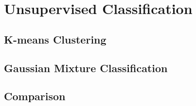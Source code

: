 \section{Unsupervised Classification}
\subsection{K-means Clustering}
\subsection{Gaussian Mixture Classification}
\subsection{Comparison}